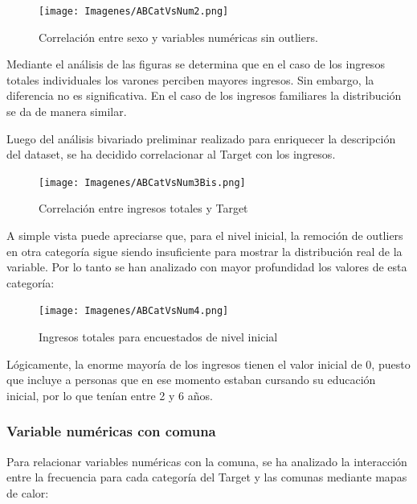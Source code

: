 \documentclass[a4paper]{article}
\begin{document}
            \begin{figure}[H]
                \centering
                \texttt{[image: Imagenes/ABCatVsNum2.png]}
                \caption{Correlación entre sexo y variables numéricas sin outliers.}
                \label{AB genre and numeric variables without outliers}
            \end{figure}
 
            Mediante el análisis de las figuras se determina que en el caso de los ingresos totales individuales los varones perciben mayores ingresos. Sin embargo, la diferencia no es significativa. En el caso de los ingresos familiares la distribución se da de manera similar. 

            Luego del análisis bivariado preliminar realizado para enriquecer la descripción del dataset, se ha decidido correlacionar al Target con los ingresos.
                \begin{figure}[H]
                \centering
                    \texttt{[image: Imagenes/ABCatVsNum3Bis.png]}
                    \caption{Correlación entre ingresos totales y Target}
                    \label{AB Target and Total Incomes}
                \end{figure}
 
            A simple vista puede apreciarse que, para el nivel inicial, la remoción de outliers en otra categoría sigue siendo insuficiente para mostrar la distribución real de la variable. Por lo tanto se han analizado con mayor profundidad los valores de esta categoría:
 
            \begin{figure}[H]
            \centering
                \texttt{[image: Imagenes/ABCatVsNum4.png]}
                \caption{Ingresos totales para encuestados de nivel inicial}
                \label{AB Total Incomes for Initial level}
            \end{figure}
 
            Lógicamente, la enorme mayoría de los ingresos tienen el valor inicial de 0, puesto que incluye a personas que en ese momento estaban cursando su educación inicial, por lo que tenían entre 2 y 6 años.

        \newpage
 
        \subsubsection{Variable numéricas con comuna}

            Para relacionar variables numéricas con la comuna, se ha analizado la interacción entre la frecuencia para cada categoría del Target y las comunas mediante mapas de calor: 
 
\end{document}

